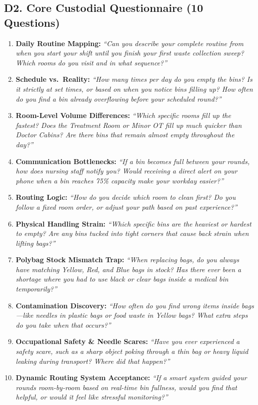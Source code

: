 \documentclass[11pt,a4paper]{article}
\begin{document}
\subsection{D2. Core Custodial Questionnaire (10 Questions)}
\begin{enumerate}[leftmargin=*, itemsep=3pt]
    \item \textbf{Daily Routine Mapping:} \emph{``Can you describe your complete routine from when you start your shift until you finish your first waste collection sweep? Which rooms do you visit and in what sequence?''}
    \item \textbf{Schedule vs.\ Reality:} \emph{``How many times per day do you empty the bins? Is it strictly at set times, or based on when you notice bins filling up? How often do you find a bin already overflowing before your scheduled round?''}
    \item \textbf{Room-Level Volume Differences:} \emph{``Which specific rooms fill up the fastest? Does the Treatment Room or Minor OT fill up much quicker than Doctor Cabins? Are there bins that remain almost empty throughout the day?''}
    \item \textbf{Communication Bottlenecks:} \emph{``If a bin becomes full between your rounds, how does nursing staff notify you? Would receiving a direct alert on your phone when a bin reaches 75\% capacity make your workday easier?''}
    \item \textbf{Routing Logic:} \emph{``How do you decide which room to clean first? Do you follow a fixed room order, or adjust your path based on past experience?''}
    \item \textbf{Physical Handling Strain:} \emph{``Which specific bins are the heaviest or hardest to empty? Are any bins tucked into tight corners that cause back strain when lifting bags?''}
    \item \textbf{Polybag Stock Mismatch Trap:} \emph{``When replacing bags, do you always have matching Yellow, Red, and Blue bags in stock? Has there ever been a shortage where you had to use black or clear bags inside a medical bin temporarily?''}
    \item \textbf{Contamination Discovery:} \emph{``How often do you find wrong items inside bags---like needles in plastic bags or food waste in Yellow bags? What extra steps do you take when that occurs?''}
    \item \textbf{Occupational Safety \& Needle Scares:} \emph{``Have you ever experienced a safety scare, such as a sharp object poking through a thin bag or heavy liquid leaking during transport? Where did that happen?''}
    \item \textbf{Dynamic Routing System Acceptance:} \emph{``If a smart system guided your rounds room-by-room based on real-time bin fullness, would you find that helpful, or would it feel like stressful monitoring?''}
\end{enumerate}
\end{document}
